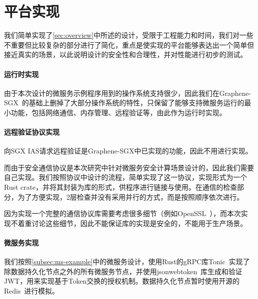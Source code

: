 \section{平台实现}\label{sec:implimentation}

我们简单实现了\cref{sec:overview}中所述的设计，受限于工程能力和时间，我们对一些不重要但比较复杂的部分进行了简化，重点是使实现的平台能够表达出一个简单但接近真实的场景，以此说明设计的安全性和合理性，并对性能进行初步的测试。

\paragraph{运行时实现}

由于本次设计的微服务示例程序用到的操作系统支持很少，因此我们在Graphene-SGX~\cite{}的基础上删掉了大部分操作系统的特性，只保留了能够支持微服务运行的最小功能，包括网络通信、内存管理、远程验证等，由此作为运行时实现。

\paragraph{远程验证协议实现}

向SGX IAS请求远程验证是Graphene-SGX中已实现的功能，因此不用进行实现。

而由于安全通信协议是本次研究中针对微服务安全计算场景设计的，因此我们需要自己实现。我们按照协议中设计的流程，简单实现了这一协议，实现形式为一个Rust crate，并将其封装为库的形式，供程序进行链接与使用。在通信的检查部分，为了方便实现，2层检查并没有采用并行的方式，而是按照顺序依次进行。

因为实现一个完整的通信协议库需要考虑很多细节（例如OpenSSL~\cite{}），而本次实现不着重讨论这些细节，因此不能保证库的实现是安全的，不能用于生产场景。

\paragraph{微服务实现}

我们按照\cref{subsec:ms-example}中的微服务设计，使用Rust的gRPC库Tonic~\cite{}实现了除数据持久化节点之外的所有微服务节点，并使用jsonwebtoken~\cite{}库生成和验证JWT，用来实现基于Token交换的授权机制。数据持久化节点暂时使用开源的Redis~\cite{}进行模拟。
